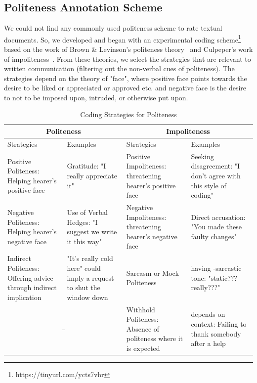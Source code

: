 \subsection{Politeness Annotation Scheme}\label{polscheme}

We could not find any commonly used politeness scheme 
to rate textual documents. 
So, we developed and began with an experimental coding scheme\footnote{https://tinyurl.com/ycts7vhr} 
based on the work of 
Brown \& Levinson's politeness theory~\cite{brown1987politeness} 
and Culpeper's work of impoliteness~\cite{culpeper1996towards}. 
From these theories, 
we select the strategies that are relevant to written communication (filtering out the non-verbal cues of politeness). 
The strategies depend on the theory of "face", 
where positive face points towards the desire 
to be liked or appreciated or approved etc. 
and negative face is the desire 
to not to be imposed upon, intruded, or otherwise put upon.

\FloatBarrier
\begin{table}[H]
	\centering
	\caption{Coding Strategies for Politeness}
	\label{poltable}
	\begin{tabular}{ | m{1.75cm} | m{2cm}|| m{2cm} | m{1.75cm} | }
		\hline
		\multicolumn{2}{|c||}{Politeness} & \multicolumn{2}{c|}{Impoliteness} \\
		\hline
		Strategies & Examples & Strategies & Examples \\ 
		\hline
		Positive Politeness: Helping hearer's positive face  & Gratitude: "I really appreciate it" & Positive Impoliteness: threatening hearer's positive face & Seeking disagreement: "I don't agree with this style of coding" \\
		\hline
		Negative Politeness: Helping hearer's negative face & Use of Verbal Hedges: "I suggest we write it this way" & Negative Impoliteness: threatening hearer's negative face  & Direct accusation: "You made these faulty changes"\\
		\hline
		Indirect Politeness: Offering advice through indirect implication & "It's really cold here" could imply a request to shut the window down & Sarcasm or Mock Politeness & having -sarcastic tone: "static??? really???" \\
		\hline
		\multicolumn{2}{c|}{--} & Withhold Politeness\tablefootnote{Excluded in the modified scheme after the experiment}: Absence of politeness where it is expected & depends on context: Failing to thank somebody after a help\\
		\cline{3-4}
	\end{tabular}
\end{table}

